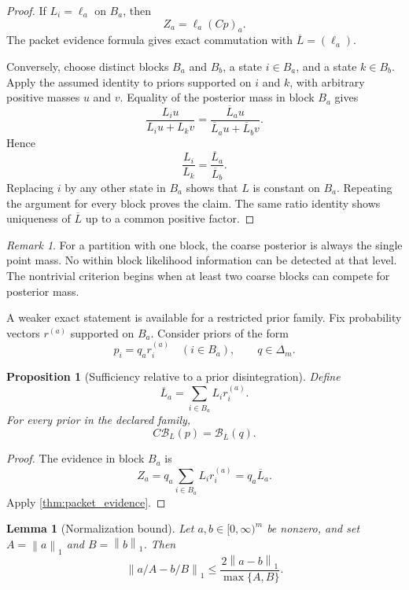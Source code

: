 \documentclass{aomart}
\newtheorem{proposition}[proposition]{Proposition}
\newtheorem{lemma}[lemma]{Lemma}
\theoremstyle{definition}
\theoremstyle{remark}
\newtheorem{remark}[remark]{Remark}
\newcommand{\Bcal}{\mathcal B}
\newcommand{\norm}[1]{\left\lVert#1\right\rVert}
\begin{document}
\begin{proof}
If \(L_i=\ell_a\) on \(B_a\), then
\[
Z_a=\ell_a(Cp)_a.
\]
The packet evidence formula gives exact commutation with \(\overline L=(\ell_a)\).

Conversely, choose distinct blocks \(B_a\) and \(B_b\), a state \(i\in B_a\), and a state \(k\in B_b\). Apply the assumed identity to priors supported on \(i\) and \(k\), with arbitrary positive masses \(u\) and \(v\). Equality of the posterior mass in block \(B_a\) gives
\[
\frac{L_iu}{L_iu+L_kv}
=
\frac{\overline L_au}{\overline L_au+\overline L_bv}.
\]
Hence
\[
\frac{L_i}{L_k}
=
\frac{\overline L_a}{\overline L_b}.
\]
Replacing \(i\) by any other state in \(B_a\) shows that \(L\) is constant on \(B_a\). Repeating the argument for every block proves the claim. The same ratio identity shows uniqueness of \(\overline L\) up to a common positive factor.
\end{proof}

\begin{remark}
For a partition with one block, the coarse posterior is always the single point mass. No within block likelihood information can be detected at that level. The nontrivial criterion begins when at least two coarse blocks can compete for posterior mass.
\end{remark}

A weaker exact statement is available for a restricted prior family. Fix probability vectors \(r^{(a)}\) supported on \(B_a\). Consider priors of the form
\[
p_i=q_ar_i^{(a)}
\quad(i\in B_a),
\qquad
q\in\Delta_m.
\]

\begin{proposition}[Sufficiency relative to a prior disintegration]\label{prop:relative_sufficiency}
Define
\[
\overline L_a
=
\sum_{i\in B_a}L_ir_i^{(a)}.
\]
For every prior in the declared family,
\[
C\Bcal_L(p)
=
\Bcal_{\overline L}(q).
\]
\end{proposition}

\begin{proof}
The evidence in block \(B_a\) is
\[
Z_a
=q_a\sum_{i\in B_a}L_ir_i^{(a)}
=q_a\overline L_a.
\]
Apply \cref{thm:packet_evidence}.
\end{proof}

\begin{lemma}[Normalization bound]\label{lem:normalization_bound}
Let \(a,b\in[0,\infty)^m\) be nonzero, and set \(A=\norm a_1\) and \(B=\norm b_1\). Then
\[
\boxed{
\norm{a/A-b/B}_1
\leq
\frac{2\norm{a-b}_1}{\max\{A,B\}}.
}
\]
\end{lemma}
\end{document}
